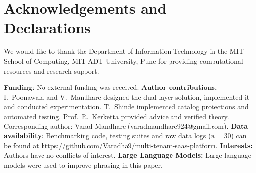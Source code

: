 \documentclass[conference]{IEEEtran}
\begin{document}
\clearpage
\section*{Acknowledgements and Declarations}
We would like to thank the Department of Information Technology in the MIT School of Computing, MIT ADT University, Pune for providing computational resources and research support.

\textbf{Funding:} No external funding was received. \textbf{Author contributions:} I.~Poonawala and V.~Mandhare designed the dual-layer solution, implemented it and conducted experimentation. T.~Shinde implemented catalog protections and automated testing. Prof.~R.~Kerketta provided advice and verified theory. Corresponding author: Varad Mandhare (varadmandhare924@gmail.com). \textbf{Data availability:} Benchmarking code, testing suites and raw data logs ($n=30$) can be found at \url{https://github.com/Varadha9/multi-tenant-saas-platform}. \textbf{Interests:} Authors have no conflicts of interest. \textbf{Large Language Models:} Large language models were used to improve phrasing in this paper.
\end{document}
